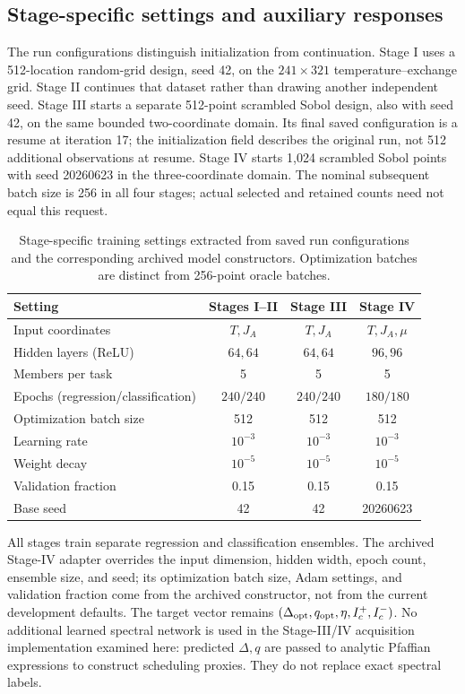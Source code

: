 \subsection{Stage-specific settings and auxiliary responses}\label{sec:stage-settings}
The run configurations distinguish initialization from continuation. Stage I uses a 512-location random-grid design, seed 42, on the $241\times321$ temperature--exchange grid. Stage II continues that dataset rather than drawing another independent seed. Stage III starts a separate 512-point scrambled Sobol design, also with seed 42, on the same bounded two-coordinate domain. Its final saved configuration is a resume at iteration 17; the initialization field describes the original run, not 512 additional observations at resume. Stage IV starts 1,024 scrambled Sobol points with seed 20260623 in the three-coordinate domain. The nominal subsequent batch size is 256 in all four stages; actual selected and retained counts need not equal this request.

\begin{table}[tb]\centering
\caption{Stage-specific training settings extracted from saved run configurations and the corresponding archived model constructors. Optimization batches are distinct from 256-point oracle batches.}\label{tab:networks}
\begin{tabular}{lccc}\toprule Setting & Stages I--II & Stage III & Stage IV\\\midrule
Input coordinates & $T,J_A$ & $T,J_A$ & $T,J_A,\mu$\\
Hidden layers (ReLU) & $64,64$ & $64,64$ & $96,96$\\
Members per task & 5 & 5 & 5\\
Epochs (regression/classification) & $240/240$ & $240/240$ & $180/180$\\
Optimization batch size & 512 & 512 & 512\\
Learning rate & $10^{-3}$ & $10^{-3}$ & $10^{-3}$\\
Weight decay & $10^{-5}$ & $10^{-5}$ & $10^{-5}$\\
Validation fraction & 0.15 & 0.15 & 0.15\\
Base seed & 42 & 42 & 20260623\\\bottomrule
\end{tabular}\end{table}
All stages train separate regression and classification ensembles. The archived Stage-IV adapter overrides the input dimension, hidden width, epoch count, ensemble size, and seed; its optimization batch size, Adam settings, and validation fraction come from the archived constructor, not from the current development defaults. The target vector remains $(\Delta_{\rm opt},q_{\rm opt},\eta,I_c^+,I_c^-)$. No additional learned spectral network is used in the Stage-III/IV acquisition implementation examined here: predicted $\Delta,q$ are passed to analytic Pfaffian expressions to construct scheduling proxies. They do not replace exact spectral labels.

